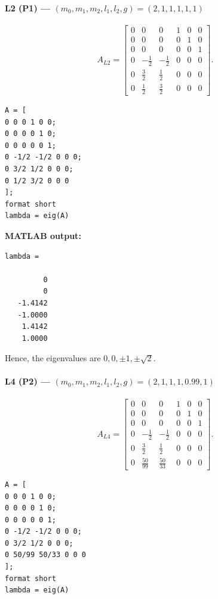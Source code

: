 \documentclass[12pt,a4paper]{article}
\begin{document}
\Needspace{2cm}
\paragraph*{L2 (P1) --- $(m_0,m_1,m_2,l_1,l_2,g)=(2,1,1,1,1,1)$}

\[
A_{L2}=\begin{bmatrix}
0 & 0 & 0 & 1 & 0 & 0 \\
0 & 0 & 0 & 0 & 1 & 0 \\
0 & 0 & 0 & 0 & 0 & 1 \\
0 & -\frac{1}{2} & -\frac{1}{2} & 0 & 0 & 0 \\
0 & \frac{3}{2} & \frac{1}{2} & 0 & 0 & 0 \\
0 & \frac{1}{2} & \frac{3}{2} & 0 & 0 & 0
\end{bmatrix}.
\]

\begin{lstlisting}
A = [
0 0 0 1 0 0;
0 0 0 0 1 0;
0 0 0 0 0 1;
0 -1/2 -1/2 0 0 0;
0 3/2 1/2 0 0 0;
0 1/2 3/2 0 0 0
];
format short
lambda = eig(A)
\end{lstlisting}

\textbf{MATLAB output:}
\begin{lstlisting}[language={}]
lambda =

         0
         0
   -1.4142
   -1.0000
    1.4142
    1.0000
\end{lstlisting}
Hence, the eigenvalues are $0,0,\pm1,\pm\sqrt{2}$.

\vspace{0.3cm}

\Needspace{2cm}
\paragraph*{L4 (P2) --- $(m_0,m_1,m_2,l_1,l_2,g)=(2,1,1,1,0.99,1)$}

\[
A_{L4}=\begin{bmatrix}
0 & 0 & 0 & 1 & 0 & 0 \\
0 & 0 & 0 & 0 & 1 & 0 \\
0 & 0 & 0 & 0 & 0 & 1 \\
0 & -\frac{1}{2} & -\frac{1}{2} & 0 & 0 & 0 \\
0 & \frac{3}{2} & \frac{1}{2} & 0 & 0 & 0 \\
0 & \frac{50}{99} & \frac{50}{33} & 0 & 0 & 0
\end{bmatrix}.
\]

\begin{lstlisting}
A = [
0 0 0 1 0 0;
0 0 0 0 1 0;
0 0 0 0 0 1;
0 -1/2 -1/2 0 0 0;
0 3/2 1/2 0 0 0;
0 50/99 50/33 0 0 0
];
format short
lambda = eig(A)
\end{lstlisting}
\end{document}
